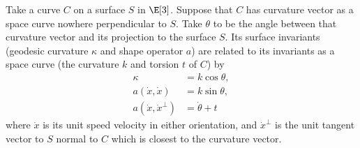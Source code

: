 \begin{lemma}
Take a curve \(C\) on a surface \(S\) in \(\E[3]\).
Suppose that \(C\) has curvature vector as a space curve nowhere perpendicular to \(S\).
Take \(\theta\) to be the angle between that curvature vector and its projection to the surface \(S\).
Its surface invariants (geodesic curvature \(\kappa\) and shape operator \(a\)) are related to its invariants as a space curve (the curvature \(k\) and torsion \(t\) of \(C\)) by
\begin{align*}
\kappa &= k\cos \theta,\\
a(\dot{x},\dot{x}) &= k\sin \theta,\\
a(\dot{x},\dot{x}^{\perp})&=\dot\theta+t
\end{align*}
where \(\dot{x}\) is its unit speed velocity in either orientation, and \(\dot{x}^{\perp}\) is the unit tangent vector to \(S\) normal to \(C\) which is closest to the curvature vector. 
\end{lemma}
